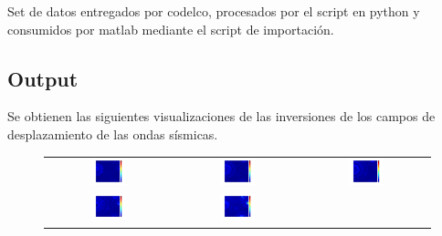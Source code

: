 Set de datos entregados por codelco, procesados por el script en python y
consumidos por matlab mediante el script de importación.

\subsection{Output}
 Se obtienen las siguientes visualizaciones de las inversiones de los campos de
 desplazamiento de las ondas sísmicas.
 
\begin{figure}[H]
\begin{tabular}{ccc}
	\includegraphics[width=0.3\textwidth]{linea_timerev/figuras/timereversal/ev1/tr124.png}&
	\includegraphics[width=0.3\textwidth]{linea_timerev/figuras/timereversal/ev1/tr125.png}&
	\includegraphics[width=0.3\textwidth]{linea_timerev/figuras/timereversal/ev1/tr126.png}\\
	\includegraphics[width=0.3\textwidth]{linea_timerev/figuras/timereversal/ev1/tr127.png}&
	\includegraphics[width=0.3\textwidth]{linea_timerev/figuras/timereversal/ev1/tr128.png}&

\end{tabular}
\end{figure}
